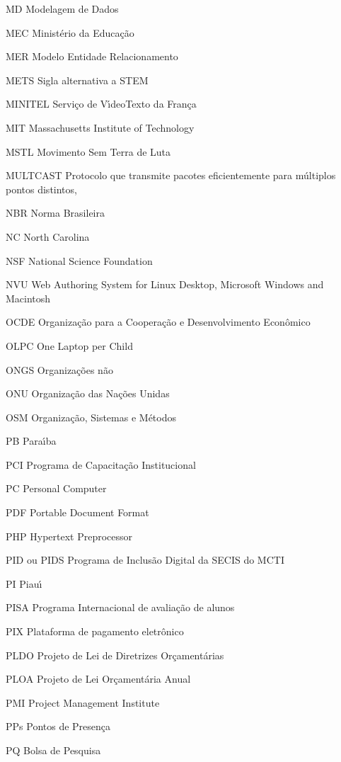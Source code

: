 \begin{siglas}
\item[MD] Modelagem de Dados
\item[MEC] Minist\'erio da Educa\c{c}\~ao
\item[MER] Modelo Entidade Relacionamento
\item[METS] Sigla alternativa a STEM
\item[MINITEL] Servi\c{c}o de V\'{\i}deoTexto da Fran\c{c}a
\item[MIT] Massachusetts Institute of Technology
\item[MSTL]  Movimento Sem Terra de Luta
\item[MULTCAST] Protocolo que transmite pacotes eficientemente para m\'ultiplos pontos distintos,
\item[NBR] Norma Brasileira
\item[NC] North Carolina
\item[NSF] National Science Foundation
\item[NVU] Web Authoring System for Linux Desktop, Microsoft Windows and Macintosh
\item[OCDE] Organiza\c{c}\~ao para a Coopera\c{c}\~ao e Desenvolvimento Econ\^omico
\item[OLPC] One Laptop per Child 
\item[ONGS] Organiza\c{c}\~oes n\~ao
\item[ONU] Organiza\c{c}\~ao das Na\c{c}\~oes Unidas
\item[OSM] Organiza\c{c}\~ao, Sistemas e M\'etodos
\item[PB] Para\'{\i}ba
\item[PCI] Programa de Capacita\c{c}\~ao Institucional
\item[PC] Personal Computer
\item[PDF] Portable Document Format
\item[PHP] Hypertext Preprocessor
\item[PID ou PIDS] Programa de Inclus\~ao Digital da SECIS do MCTI
\item[PI] Piau\'{\i}
\item[PISA] Programa Internacional de avalia\c{c}\~ao de alunos
\item[PIX] Plataforma de pagamento eletr\^onico
\item[PLDO] Projeto de Lei de Diretrizes Or\c{c}ament\'arias
\item[PLOA] Projeto de Lei Or\c{c}ament\'aria Anual
\item[PMI] Project Management Institute
\item[PPs] Pontos de Presen\c{c}a 
\item[PQ] Bolsa de Pesquisa

\end{siglas}
